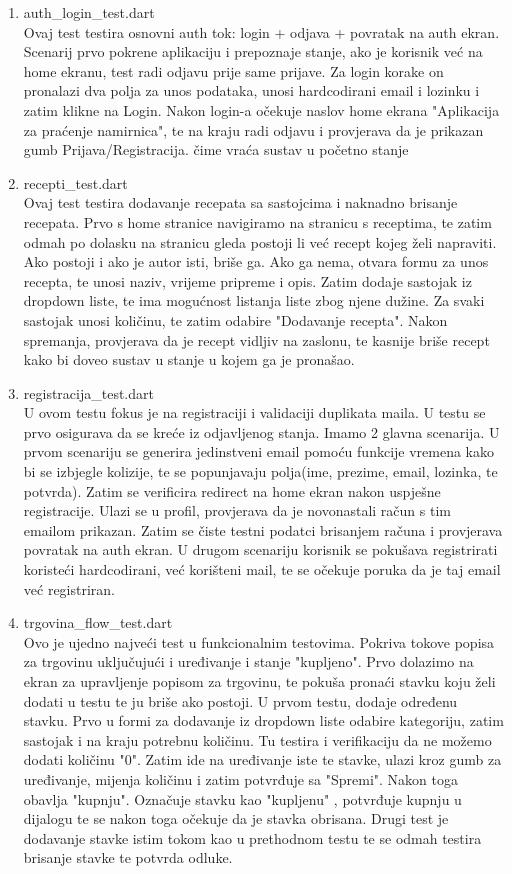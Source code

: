 \documentclass[diplomskirad]{fer}
\begin{document}
\begin{enumerate}
    \item auth\_login\_test.dart
    \\
    Ovaj test testira osnovni auth tok: login + odjava + povratak na auth ekran. Scenarij prvo pokrene aplikaciju i prepoznaje stanje, ako je korisnik već na home ekranu, test radi odjavu prije same prijave. Za login korake on pronalazi dva polja za unos podataka, unosi hardcodirani email i lozinku i zatim klikne na Login. Nakon login-a očekuje naslov home ekrana "Aplikacija za praćenje namirnica", te na kraju radi odjavu i provjerava da je prikazan gumb Prijava/Registracija. čime vraća sustav u početno stanje
    \item recepti\_test.dart
    \\
    Ovaj test testira dodavanje recepata sa sastojcima i naknadno brisanje recepata. Prvo s home stranice navigiramo na stranicu s receptima, te zatim odmah po dolasku na stranicu gleda postoji li već recept kojeg želi napraviti. Ako postoji i ako je autor isti, briše ga. Ako ga nema, otvara formu za unos recepta, te unosi naziv, vrijeme pripreme i opis. Zatim dodaje sastojak iz dropdown liste, te ima mogućnost listanja liste zbog njene dužine. Za svaki sastojak unosi količinu, te zatim odabire "Dodavanje recepta". Nakon spremanja, provjerava da je recept vidljiv na zaslonu, te kasnije briše recept kako bi doveo sustav u stanje u kojem ga je pronašao.
    \item registracija\_test.dart
    \\
    U ovom testu fokus je na registraciji i validaciji duplikata maila. U testu se prvo osigurava da se kreće iz odjavljenog stanja. Imamo 2 glavna scenarija. U prvom scenariju se generira jedinstveni email pomoću funkcije vremena kako bi se izbjegle kolizije, te se popunjavaju polja(ime, prezime, email, lozinka, te potvrda). Zatim se verificira redirect na home ekran nakon uspješne registracije. Ulazi se u profil, provjerava da je novonastali račun s tim emailom prikazan. Zatim se čiste testni podatci brisanjem računa i provjerava povratak na auth ekran. U drugom scenariju korisnik se pokušava registrirati koristeći hardcodirani, već korišteni mail, te se očekuje poruka da je taj email već registriran.
    \item trgovina\_flow\_test.dart
    \\
    Ovo je ujedno najveći test u funkcionalnim testovima. Pokriva tokove popisa za trgovinu uključujući i uređivanje i stanje "kupljeno". Prvo dolazimo na ekran za upravljenje popisom za trgovinu, te pokuša pronaći stavku koju želi dodati u testu te ju briše ako postoji. U prvom testu, dodaje određenu stavku. Prvo u formi za dodavanje iz dropdown liste odabire kategoriju, zatim sastojak i na kraju potrebnu količinu. Tu testira i verifikaciju da ne možemo dodati količinu "0". Zatim ide na uređivanje iste te stavke, ulazi kroz gumb za uređivanje, mijenja količinu i zatim potvrđuje sa "Spremi". Nakon toga obavlja "kupnju". Označuje stavku kao "kupljenu" , potvrđuje kupnju u dijalogu te se nakon toga očekuje da je stavka obrisana. Drugi test je dodavanje stavke istim tokom kao u prethodnom testu te se odmah testira brisanje stavke te potvrda odluke.

\end{enumerate}
\end{document}
